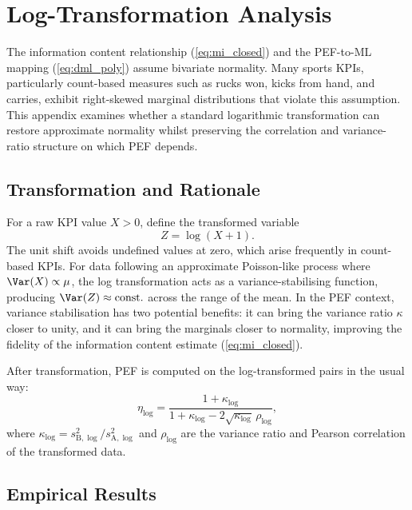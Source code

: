 \section{Log-Transformation Analysis}
\label{sec:appendix_log}

The information content relationship (\cref{eq:mi_closed}) and the PEF-to-ML mapping (\cref{eq:dml_poly}) assume bivariate normality. Many sports KPIs, particularly count-based measures such as rucks won, kicks from hand, and carries, exhibit right-skewed marginal distributions that violate this assumption. This appendix examines whether a standard logarithmic transformation can restore approximate normality whilst preserving the correlation and variance-ratio structure on which PEF depends.

\subsection{Transformation and Rationale}

For a raw KPI value $X>0$, define the transformed variable
\begin{equation}
  Z = \log(X + 1).
  \label{eq:log_transform}
\end{equation}
The unit shift avoids undefined values at zero, which arise frequently in count-based KPIs. For data following an approximate Poisson-like process where $\Var(X)\propto\mu$, the log transformation acts as a variance-stabilising function, producing $\Var(Z)\approx\text{const.}$ across the range of the mean. In the PEF context, variance stabilisation has two potential benefits: it can bring the variance ratio $\kappa$ closer to unity, and it can bring the marginals closer to normality, improving the fidelity of the information content estimate (\cref{eq:mi_closed}).

After transformation, PEF is computed on the log-transformed pairs in the usual way:
\begin{equation}
  \eta_{\log} = \frac{1+\kappa_{\log}}{1+\kappa_{\log}-2\sqrt{\kappa_{\log}}\,\rho_{\log}},
  \label{eq:pef_log}
\end{equation}
where $\kappa_{\log}=s^{2}_{\mathrm{B,\log}}/s^{2}_{\mathrm{A,\log}}$ and $\rho_{\log}$ are the variance ratio and Pearson correlation of the transformed data.

\subsection{Empirical Results}

